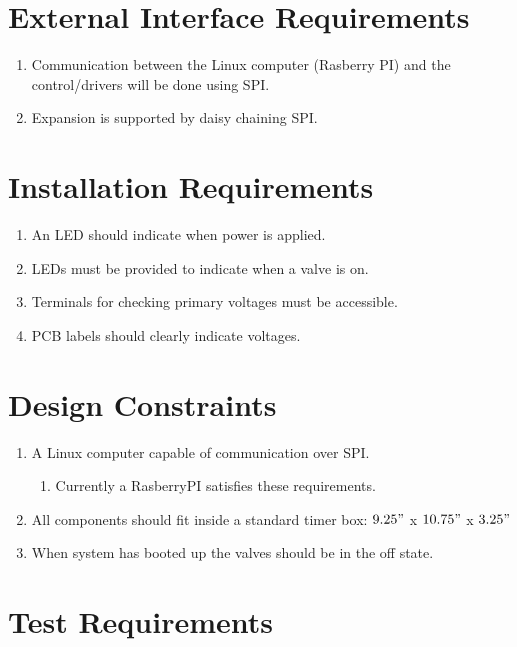 \documentclass[12pt,letterpaper]{article}
\begin{document}

\pagebreak
\section{External Interface Requirements}
\begin{enumerate}
\item Communication between the Linux computer (Rasberry PI) and
		the control/drivers will be done using SPI.
\item Expansion is supported by daisy chaining SPI.
\end{enumerate}


\section{Installation Requirements}
\begin{enumerate}
	\item An LED should indicate when power is applied.
	\item LEDs must be provided to indicate when a valve is on.
	\item Terminals for checking primary voltages must be accessible.
	\item PCB labels should clearly indicate voltages.
\end{enumerate}

\section{Design Constraints}

\begin{enumerate}
	\item A Linux computer capable of communication over SPI.
	\begin{enumerate}
		\item Currently a RasberryPI\autocite{rpi} satisfies these requirements.
	\end{enumerate}
	\item All components should fit inside a standard timer box:
		$9.25"$ x $10.75"$ x $3.25"$
	\item When system has booted up the valves should be in the off state.
\end{enumerate}

\section{Test Requirements}
\end{document}
